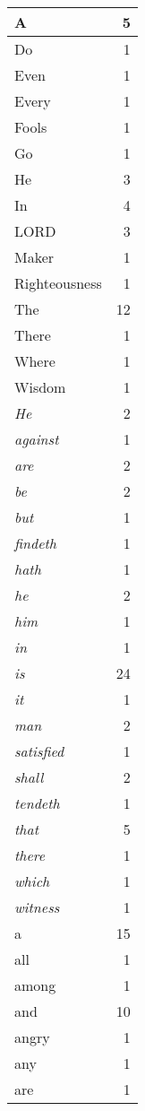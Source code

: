 \begin{center}
\begin{longtable}{l|r}
A & 5\\ \hline 
Do & 1\\ \hline 
Even & 1\\ \hline 
Every & 1\\ \hline 
Fools & 1\\ \hline 
Go & 1\\ \hline 
He & 3\\ \hline 
In & 4\\ \hline 
LORD & 3\\ \hline 
Maker & 1\\ \hline 
Righteousness & 1\\ \hline 
The & 12\\ \hline 
There & 1\\ \hline 
Where & 1\\ \hline 
Wisdom & 1\\ \hline 
\emph{He} & 2\\ \hline 
\emph{against} & 1\\ \hline 
\emph{are} & 2\\ \hline 
\emph{be} & 2\\ \hline 
\emph{but} & 1\\ \hline 
\emph{findeth} & 1\\ \hline 
\emph{hath} & 1\\ \hline 
\emph{he} & 2\\ \hline 
\emph{him} & 1\\ \hline 
\emph{in} & 1\\ \hline 
\emph{is} & 24\\ \hline 
\emph{it} & 1\\ \hline 
\emph{man} & 2\\ \hline 
\emph{satisfied} & 1\\ \hline 
\emph{shall} & 2\\ \hline 
\emph{tendeth} & 1\\ \hline 
\emph{that} & 5\\ \hline 
\emph{there} & 1\\ \hline 
\emph{which} & 1\\ \hline 
\emph{witness} & 1\\ \hline 
a & 15\\ \hline 
all & 1\\ \hline 
among & 1\\ \hline 
and & 10\\ \hline 
angry & 1\\ \hline 
any & 1\\ \hline 
are & 1\\ \hline 

\end{longtable}
\end{center}
